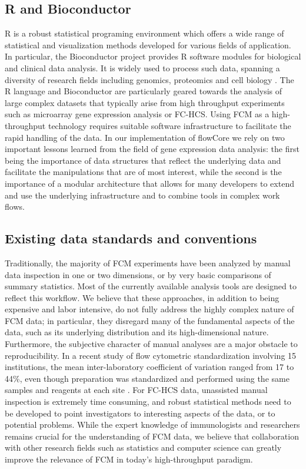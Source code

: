 \documentclass[12pt]{article}
\newcommand{\Rpackage}[1]{{\textsf{#1}}}
\begin{document}
\subsection*{R and Bioconductor}
R is a robust statistical programing environment which offers a wide
range of statistical and visualization methods developed for various
fields of application. In particular, the Bioconductor project
provides R software modules for biological and clinical data analysis.
It is widely used to process such data, spanning a diversity of
research fields including genomics, proteomics and cell biology
\citep{BIOC}. The R language and Bioconductor are particularly geared
towards the analysis of large complex datasets that typically arise
from high throughput experiments such as microarray gene expression
analysis or FC-HCS. Using FCM as a high-throughput technology requires
suitable software infrastructure to facilitate the rapid handling of
the data. In our implementation of \Rpackage{flowCore} we rely on two
important lessons learned from the field of gene expression data
analysis: the first being the importance of data structures that
reflect the underlying data and facilitate the manipulations that are
of most interest, while the second is the importance of a modular
architecture that allows for many developers to extend and use the
underlying infrastructure and to combine tools in complex work flows.

\subsection*{Existing data standards and conventions}
Traditionally, the majority of FCM experiments have been analyzed by
manual data inspection in one or two dimensions, or by very basic
comparisons of summary statistics. Most of the currently available
analysis tools are designed to reflect this workflow.  We believe that
these approaches, in addition to being expensive and labor intensive,
do not fully address the highly complex nature of FCM data; in
particular, they disregard many of the fundamental aspects of the
data, such as its underlying distribution and its high-dimensional
nature. Furthermore, the subjective character of manual analyses are a
major obstacle to reproducibility. In a recent study of flow
cytometric standardization involving 15 institutions, the mean
inter-laboratory coefficient of variation ranged from 17 to 44\%, even
though preparation was standardized and performed using the same
samples and reagents at each site \citep{Maecker2005}. For FC-HCS
data, unassisted manual inspection is extremely time consuming, and
robust statistical methods need to be developed to point investigators
to interesting aspects of the data, or to potential problems. While
the expert knowledge of immunologists and researchers remains crucial
for the understanding of FCM data, we believe that collaboration with
other research fields such as statistics and computer science can
greatly improve the relevance of FCM in today's high-throughput
paradigm.
\end{document}
